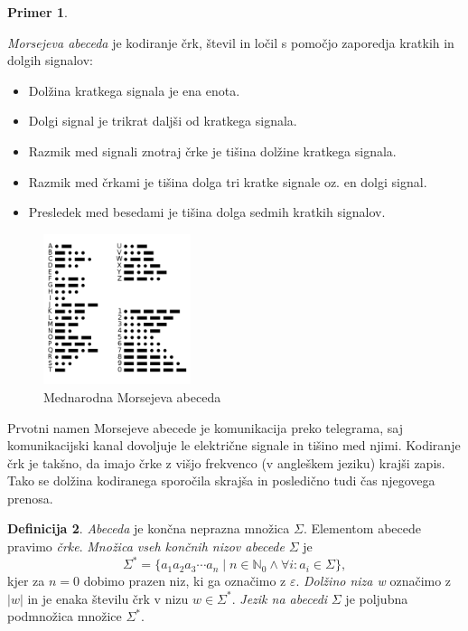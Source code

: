 \documentclass{amsart}
\newcommand{\N}{\mathbb{N}}
\theoremstyle{definition} %
\newtheorem{definicija}{Definicija}[section]
\newtheorem{primer}[definicija]{Primer}
\theoremstyle{plain} %
\begin{document}
\begin{primer}\label{Morse}

    \textit{Morsejeva abeceda} je kodiranje črk, števil in ločil s pomočjo zaporedja kratkih
    in dolgih signalov:

    \begin{itemize}
        \item Dolžina kratkega signala je ena enota.
        \item Dolgi signal je trikrat daljši od kratkega signala.
        \item Razmik med signali znotraj črke je tišina dolžine kratkega signala.
        \item Razmik med črkami je tišina dolga tri kratke signale oz. en dolgi signal.
        \item Presledek med besedami je tišina dolga sedmih kratkih signalov.
    \end{itemize}

    \begin{figure}[h]
        \centering
        \includegraphics[width=4.3cm]{International_Morse_Code.svg.png}
        \caption{Mednarodna Morsejeva abeceda}
        \label{fig:Morse}
    \end{figure}

    Prvotni namen Morsejeve abecede je komunikacija preko telegrama, saj komunikacijski
    kanal dovoljuje le električne signale in tišino med njimi. Kodiranje črk je takšno,
    da imajo črke z višjo frekvenco (v angleškem jeziku) krajši zapis. Tako se dolžina
    kodiranega sporočila skrajša in posledično tudi čas njegovega prenosa.

\end{primer}

\begin{definicija}

    \textit{Abeceda} je končna neprazna množica $ \Sigma $. Elementom abecede pravimo \textit{črke}.
    \textit{Množica vseh končnih nizov abecede} $ \Sigma $ je
    \[
        \Sigma^* = \{ a_1 a_2 a_3 \cdots a_n \mid n \in \N_0 \land \forall i: a_i \in \Sigma \}, 
    \]
    kjer za $ n = 0 $ dobimo prazen niz, ki ga označimo z $ \varepsilon $.
    \textit{Dolžino niza w} označimo z $ |w| $ in je enaka številu črk v nizu $ w \in \Sigma^* $.
    \textit{Jezik na abecedi} $ \Sigma $ je poljubna podmnožica množice $ \Sigma^* $. 

\end{definicija}
\end{document}
